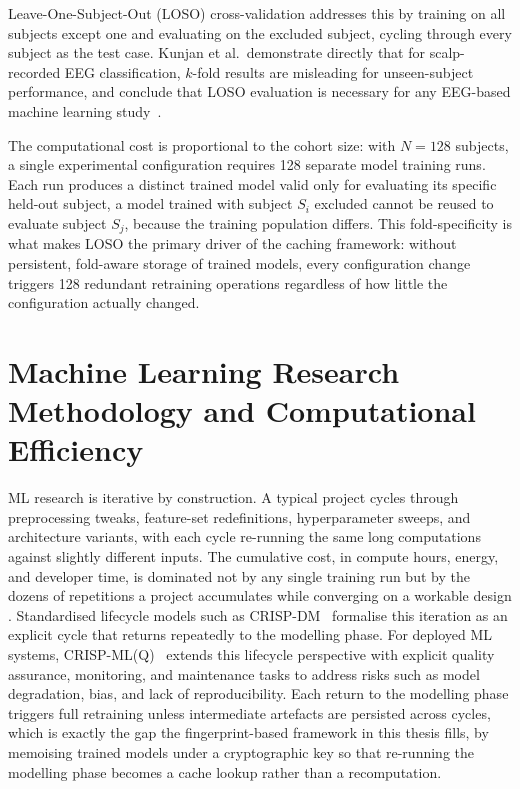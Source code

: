Leave-One-Subject-Out (LOSO) cross-validation addresses this by training
on all subjects except one and evaluating on the excluded subject, cycling
through every subject as the test case. Kunjan et al.\ demonstrate directly
that for scalp-recorded EEG classification, $k$-fold results are misleading
for unseen-subject performance, and conclude that LOSO evaluation is
necessary for any EEG-based machine learning study~\cite{kunjan2021loso}.

The computational cost is proportional to the cohort size: with $N = 128$
subjects, a single experimental configuration requires 128 separate model
training runs. Each run produces a distinct trained model valid only for
evaluating its specific held-out subject, a model trained with subject
$S_i$ excluded cannot be reused to evaluate subject $S_j$, because the
training population differs. This fold-specificity is what makes LOSO the
primary driver of the caching framework: without persistent, fold-aware
storage of trained models, every configuration change triggers 128
redundant retraining operations regardless of how little the configuration
actually changed.

\section{Machine Learning Research Methodology and Computational Efficiency}
\label{sec:mlresearch_efficiency}
\label{sec:mlresearch}
\label{sec:comp_efficiency}

ML research is iterative by construction. A typical project cycles through preprocessing tweaks, feature-set redefinitions, hyperparameter sweeps, and architecture variants, with each cycle re-running the same long computations against slightly different inputs. The cumulative cost, in compute hours, energy, and developer time, is dominated not by any single training run but by the dozens of repetitions a project accumulates while converging on a workable design \cite{sculley2015hidden}. Standardised lifecycle models such as CRISP-DM~\cite{crispdm2000} formalise this iteration as an explicit cycle that returns repeatedly to the modelling phase. For deployed ML systems, CRISP-ML(Q)~\cite{studer2021crispmlq} extends this lifecycle perspective with explicit quality assurance, monitoring, and maintenance tasks to address risks such as model degradation, bias, and lack of reproducibility. Each return to the modelling phase triggers full retraining unless intermediate artefacts are persisted across cycles, which is exactly the gap the fingerprint-based framework in this thesis fills, by memoising trained models under a cryptographic key so that re-running the modelling phase becomes a cache lookup rather than a recomputation.

